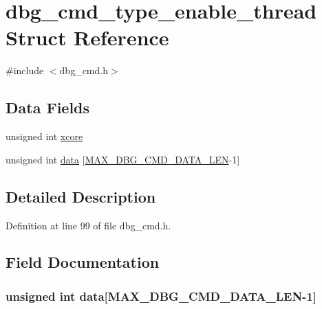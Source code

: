 \hypertarget{structdbg__cmd__type__enable__thread}{\section{dbg\-\_\-cmd\-\_\-type\-\_\-enable\-\_\-thread Struct Reference}
\label{structdbg__cmd__type__enable__thread}
}


{\ttfamily \#include $<$dbg\-\_\-cmd.\-h$>$}

\subsection*{Data Fields}
\begin{DoxyCompactItemize}
\item 
unsigned int \hyperlink{structdbg__cmd__type__enable__thread_a78357326dd562d441c3c73f5676ac638}{xcore}
\item 
unsigned int \hyperlink{structdbg__cmd__type__enable__thread_abceed6826af53b88f4cc936fac1716f0}{data} \mbox{[}\hyperlink{dbg__cmd_8h_a4552ec15033c8a68870cdf80eda5470c}{M\-A\-X\-\_\-\-D\-B\-G\-\_\-\-C\-M\-D\-\_\-\-D\-A\-T\-A\-\_\-\-L\-E\-N}-\/1\mbox{]}
\end{DoxyCompactItemize}


\subsection{Detailed Description}


Definition at line 99 of file dbg\-\_\-cmd.\-h.



\subsection{Field Documentation}
\hypertarget{structdbg__cmd__type__enable__thread_abceed6826af53b88f4cc936fac1716f0}{
\subsubsection[{data}]{\setlength{\rightskip}{0pt plus 5cm}unsigned int data\mbox{[}{\bf M\-A\-X\-\_\-\-D\-B\-G\-\_\-\-C\-M\-D\-\_\-\-D\-A\-T\-A\-\_\-\-L\-E\-N}-\/1\mbox{]}}}\label{structdbg__cmd__type__enable__thread_abceed6826af53b88f4cc936fac1716f0}


